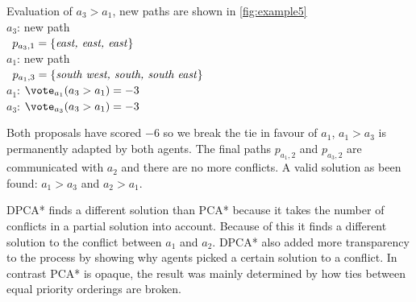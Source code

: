  Evaluation of $a_3 > a_1$, new paths are shown in \autoref{fig:example5}
\\ \-\qquad $a_3$: new path
\\ \-\qquad\quad\,\; $p_{a_3,1} = \{\text{\emph{east, east, east}}\}$
\\ \-\qquad $a_1$: new path
\\ \-\qquad\quad\,\; $p_{a_1,3} = \{\text{\emph{south west, south, south 
east}}\}$
\\ \-\qquad $a_1$: $\vote_{a_1}(a_3 > a_1) = -3$
\\ \-\qquad $a_3$: $\vote_{a_3}(a_3 > a_1) = -3$

Both proposals have scored $-6$ so we break the tie in favour of $a_1$, $a_1 > 
a_3$ is permanently adapted by both agents. The final paths $p_{a_1,2}$ and 
$p_{a_3,2}$ are communicated with $a_2$ and there are no more conflicts. A 
valid solution as been found: $a_1 > a_3$ and $a_2 > a_1$.

DPCA* finds a different solution than PCA* because it takes the number of 
conflicts in a partial solution into account. Because of this it finds a 
different solution to the conflict between $a_1$ and $a_2$. DPCA* also added 
more transparency to the process by showing why agents picked a certain 
solution to a conflict. In contrast PCA* is opaque, the result was mainly 
determined by how ties between equal priority orderings are broken.

